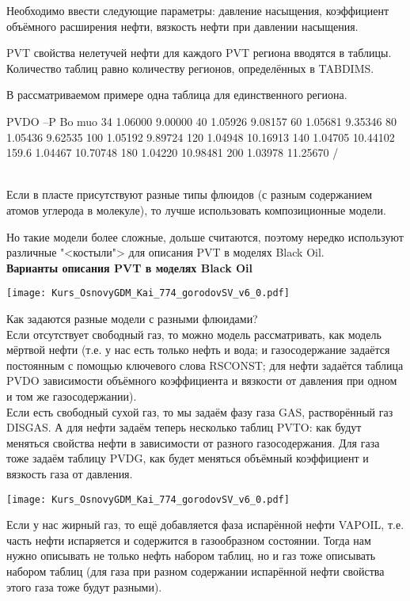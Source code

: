 Необходимо ввести следующие параметры: давление насыщения, коэффициент объёмного расширения нефти, вязкость нефти при давлении насыщения.

PVT свойства нелетучей нефти для каждого PVT региона вводятся в таблицы.
Количество таблиц равно количеству регионов, определённых в TABDIMS.

В рассматриваемом примере одна таблица для единственного региона.

\begin{eclrun}
PVDO 
--P     Bo      muo
34     1.06000  9.00000
40     1.05926  9.08157
60     1.05681  9.35346
80     1.05436  9.62535
100    1.05192  9.89724
120    1.04948  10.16913
140    1.04705  10.44102
159.6  1.04467  10.70748
180    1.04220  10.98481
200    1.03978  11.25670
/
\end{eclrun}
\ \\

Если в пласте присутствуют разные типы флюидов (с разным содержанием атомов углерода в молекуле), то лучше использовать композиционные модели.

Но такие модели более сложные, дольше считаются, поэтому нередко используют различные "<костыли"> для описания PVT в моделях Black Oil.
\\

\textbf{Варианты описания PVT в моделях Black Oil}

\texttt{[image: Kurs\_OsnovyGDM\_Kai\_774\_gorodovSV\_v6\_0.pdf]}

Как задаются разные модели с разными флюидами?
\\

Если отсутствует свободный газ, то можно модель рассматривать, как модель мёртвой нефти (т.е. у нас есть только нефть и вода; и газосодержание задаётся постоянным с помощью ключевого слова RSCONST; для нефти задаётся таблица PVDO зависимости объёмного коэффициента и вязкости от давления при одном и том же газосодержании).
\\

Если есть свободный сухой газ, то мы задаём фазу газа GAS, растворённый газ DISGAS.
А для нефти задаём теперь несколько таблиц PVTO: как будут меняться свойства нефти в зависимости от разного газосодержания.
Для газа тоже задаём таблицу PVDG, как будет меняться объёмный коэффициент и вязкость газа от давления.

\texttt{[image: Kurs\_OsnovyGDM\_Kai\_774\_gorodovSV\_v6\_0.pdf]}

Если у нас жирный газ, то ещё добавляется фаза испарённой нефти VAPOIL, т.е. часть нефти испаряется и содержится в газообразном состоянии.
Тогда нам нужно описывать не только нефть набором таблиц, но и газ тоже описывать набором таблиц (для газа при разном содержании испарённой нефти свойства этого газа тоже будут разными).
\\

